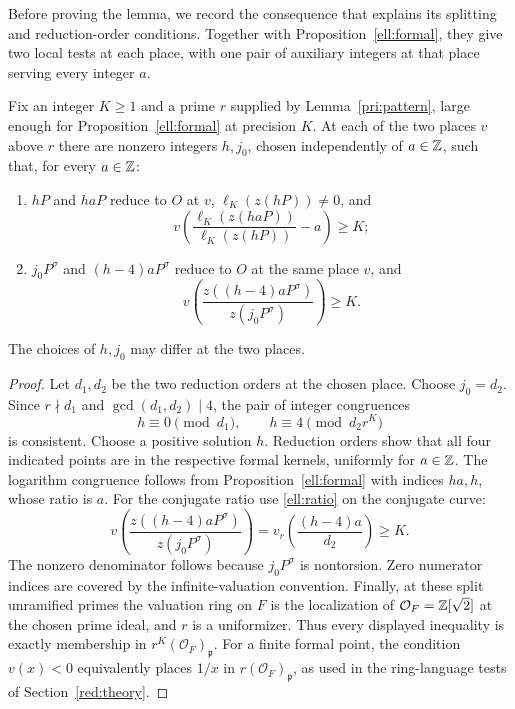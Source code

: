 Before proving the lemma, we record the consequence that explains its
splitting and reduction-order conditions. Together with
Proposition~\ref{ell:formal}, they give two local tests at each place,
with one pair of auxiliary integers at that place serving every integer $a$.

\begin{corollary}\label{pri:integer-tests}
Fix an integer $K\ge1$ and a prime $r$ supplied by Lemma~\ref{pri:pattern}, large
enough for Proposition~\ref{ell:formal} at precision $K$.  At each of
the two places $v$ above $r$ there are nonzero integers $h,j_0$, chosen
independently of $a\in\mathbb Z$, such that, for every $a\in\mathbb Z$:
\begin{enumerate}
\item $hP$ and $haP$ reduce to $O$ at $v$,
      $\ell_K(z(hP))\ne0$, and
\[
           v\!\left(\frac{\ell_K(z(haP))}{\ell_K(z(hP))}-a\right)
                                                              \ge K;
\]
\item $j_0P^\sigma$ and $(h-4)aP^\sigma$ reduce to $O$ at the
      same place $v$, and
\[
            v\!\left(\frac{z((h-4)aP^\sigma)}{z(j_0P^\sigma)}\right)
                                                              \ge K.
\]
\end{enumerate}
The choices of $h,j_0$ may differ at the two places.
\end{corollary}

\begin{proof}
Let $d_1,d_2$ be the two reduction orders at the chosen place.  Choose
$j_0=d_2$.  Since $r\nmid d_1$ and $\gcd(d_1,d_2)\mid4$, the pair of
integer congruences
\[
                  h\equiv0\pmod{d_1},\qquad
                  h\equiv4\pmod{d_2r^K}
\]
is consistent.  Choose a positive solution $h$.  Reduction orders
show that all four indicated points are in the respective formal
kernels, uniformly for $a\in\mathbb Z$.  The logarithm congruence follows from
Proposition~\ref{ell:formal} with indices $ha,h$, whose ratio is $a$.
For the conjugate ratio use \eqref{ell:ratio} on the conjugate curve:
\[
 v\!\left(\frac{z((h-4)aP^\sigma)}{z(j_0P^\sigma)}\right)
          =v_r\!\left(\frac{(h-4)a}{d_2}\right)\ge K.
\]
The nonzero denominator follows because $j_0P^\sigma$ is nontorsion.
Zero numerator indices are covered by the infinite-valuation
convention.  Finally, at these split unramified primes the valuation
ring on $F$ is the localization of $\mathcal O_F=\mathbb Z[\sqrt2]$ at the
chosen prime ideal, and $r$ is a uniformizer.  Thus every displayed
inequality is exactly membership in $r^K(\mathcal O_F)_{\mathfrak p}$.
For a finite formal point, the condition $v(x)<0$ equivalently places
$1/x$ in $r(\mathcal O_F)_{\mathfrak p}$, as used in the ring-language tests of
Section~\ref{red:theory}.
\end{proof}

